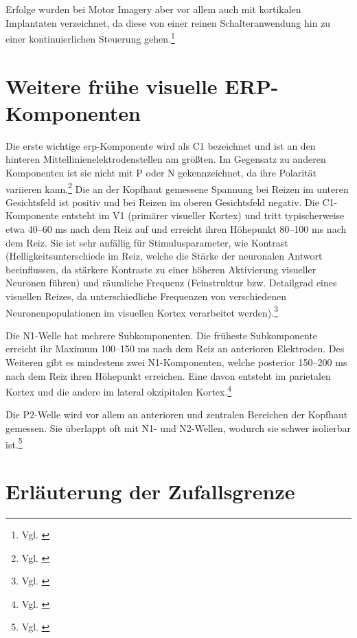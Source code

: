 Erfolge wurden bei Motor Imagery aber vor allem auch mit kortikalen Implantaten verzeichnet, da diese von einer reinen Schalteranwendung hin zu einer kontinuierlichen Steuerung gehen.\footnote{Vgl. \cite[S.~372]{hochberg2012_roboticarm}}

\section*{Weitere frühe visuelle ERP-Komponenten}

Die erste wichtige \acrshort{erp}-Komponente wird als C1 bezeichnet und ist an den hinteren Mittellinienelektrodenstellen am größten. Im Gegensatz zu anderen Komponenten ist sie nicht mit P oder N gekennzeichnet, da ihre Polarität variieren kann.\footnote{Vgl. \cite[S.~35]{luck2005}} Die an der Kopfhaut gemessene Spannung bei Reizen im unteren Gesichtsfeld ist positiv und bei Reizen im oberen Gesichtsfeld negativ. Die C1-Komponente entsteht im V1 (primärer visueller Kortex) und tritt typischerweise etwa 40--60 ms nach dem Reiz auf und erreicht ihren Höhepunkt 80--100 ms nach dem Reiz. Sie ist sehr anfällig für Stimulusparameter, wie Kontrast (Helligkeitsunterschiede im Reiz, welche die Stärke der neuronalen Antwort beeinflussen, da stärkere Kontraste zu einer höheren Aktivierung visueller Neuronen führen) und räumliche Frequenz (Feinstruktur bzw. Detailgrad eines visuellen Reizes, da unterschiedliche Frequenzen von verschiedenen Neuronenpopulationen im visuellen Kortex verarbeitet werden).\footnote{Vgl. \cite[S.~35]{luck2005}}

Die N1-Welle hat mehrere Subkomponenten. Die früheste Subkomponente erreicht ihr Maximum 100--150 ms nach dem Reiz an anterioren Elektroden. Des Weiteren gibt es mindestens zwei N1-Komponenten, welche posterior 150--200 ms nach dem Reiz ihren Höhepunkt erreichen. Eine davon entsteht im parietalen Kortex und die andere im lateral okzipitalen Kortex.\footnote{Vgl. \cite[S.~37]{luck2005}}

Die P2-Welle wird vor allem an anterioren und zentralen Bereichen der Kopfhaut gemessen. Sie überlappt oft mit N1- und N2-Wellen, wodurch sie schwer isolierbar ist.\footnote{Vgl. \cite[S.~8]{ordikhani2016_neurofeedback}}

\section*{Erläuterung der Zufallsgrenze}
\label{anh:zufallsgrenze}

